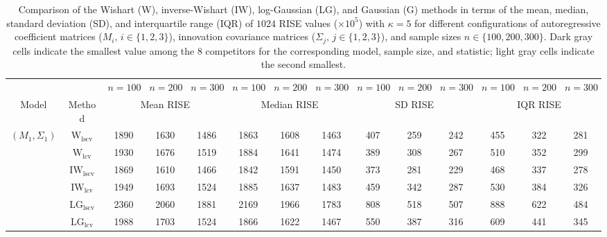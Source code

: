 \begin{table}[!ht]
\caption{Comparison of the Wishart (W), inverse-Wishart (IW), log-Gaussian (LG), and Gaussian (G) methods in terms of the mean, median, standard deviation (SD), and interquartile range (IQR) of $1024$ RISE values ($\times 10^5$) with $\kappa = 5$ for different configurations of autoregressive coefficient matrices ($M_i, \, i\in \{1,2,3\}$), innovation covariance matrices ($\Sigma_j, \, j\in \{1,2,3\}$), and sample sizes $n \in \{100, 200, 300\}$. Dark gray cells indicate the smallest value among the 8 competitors for the corresponding model, sample size, and statistic; light gray cells indicate the second smallest.}
\label{tab:summary}

\fontsize{7.9}{7}\selectfont\renewcommand{\arraystretch}{0}
\setlength{\tabcolsep}{1.2pt}
\setlength{\aboverulesep}{0.35ex}
\setlength{\belowrulesep}{0.35ex}
\centering
{
\begin{tabular}{@{}cc|ccc|ccc|ccc|ccc@{}}
\toprule
\multicolumn{2}{c|}{} & $n = 100$ & $n = 200$ & $n = 300$ & $n = 100$ & $n = 200$ & $n = 300$ & $n = 100$ & $n = 200$ & $n = 300$ & $n = 100$ & $n = 200$ & $n = 300$ \\
\cmidrule(r){1-2}\cmidrule(lr){3-5}\cmidrule(lr){6-8}\cmidrule(lr){9-11}\cmidrule(l){12-14}
Model & Method & \multicolumn{3}{c|}{Mean RISE} & \multicolumn{3}{c|}{Median RISE} & \multicolumn{3}{c|}{SD RISE} & \multicolumn{3}{c}{IQR RISE} \\
\midrule
$(M_1,\Sigma_1)$ & $\mathrm{W}_{\mathrm{lscv}}$ & \cellcolor{black!10}1890 & \cellcolor{black!10}1630 & \cellcolor{black!10}1486 & \cellcolor{black!10}1863 & \cellcolor{black!10}1608 & \cellcolor{black!10}1463 & 407 & 259 & 242 & 455 & 322 & 281 \\ 
 & $\mathrm{W}_{\mathrm{lcv}}$ & 1930 & 1676 & 1519 & 1884 & 1641 & 1474 & 389 & 308 & 267 & 510 & 352 & 299 \\ 
 & $\mathrm{IW}_{\mathrm{lscv}}$ & \cellcolor{black!30}1869 & \cellcolor{black!30}1610 & \cellcolor{black!30}1466 & \cellcolor{black!30}1842 & \cellcolor{black!30}1591 & \cellcolor{black!30}1450 & 373 & 281 & \cellcolor{black!10}229 & 468 & 337 & 278 \\ 
 & $\mathrm{IW}_{\mathrm{lcv}}$ & 1949 & 1693 & 1524 & 1885 & 1637 & 1483 & 459 & 342 & 287 & 530 & 384 & 326 \\ 
 & $\mathrm{LG}_{\mathrm{lscv}}$ & 2360 & 2060 & 1881 & 2169 & 1966 & 1783 & 808 & 518 & 507 & 888 & 622 & 484 \\ 
 & $\mathrm{LG}_{\mathrm{lcv}}$ & 1988 & 1703 & 1524 & 1866 & 1622 & 1467 & 550 & 387 & 316 & 609 & 441 & 345 \\ 

\end{tabular}}
\end{table}
